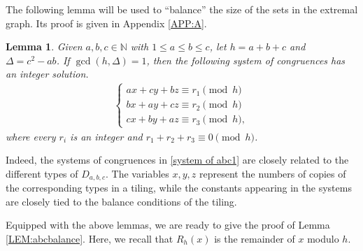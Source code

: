 \documentclass[11pt,a4paper,reqno]{amsart}
\newtheorem{lemma}[theorem]{Lemma}
\theoremstyle{definition} %
\begin{document}
The following lemma will be used to ``balance'' the size of the sets in the extremal graph. Its proof is given in Appendix \ref{APP:A}.


\begin{lemma}\label{LEM-abc system2}   Given $a,b,c\in \mathbb{N}$ with $1\leqslant a\leqslant b\leqslant c$, let $h=a+b+c$ and $\Delta=c^2-ab$. If $\gcd(h,\Delta)=1$, then the following system of congruences has an integer solution.
    \begin{align}\label{system of abc1}
\begin{cases}
ax + cy + bz \equiv r_1 \pmod h\\
bx + ay + cz \equiv r_2 \pmod h\\
cx + by + az \equiv r_3 \pmod h,
\end{cases}
\end{align} 
where every $r_i$ is an integer and $r_1+r_2+r_3 \equiv 0\pmod h$.
\end{lemma}

Indeed, the systems of congruences in \eqref{system of abc1} are closely related to the different types of $D_{a,b,c}$. The variables $x,y,z$ represent the numbers of copies of the corresponding types in a tiling, while the constants appearing in the systems are closely tied to the balance conditions of the tiling.

\smallskip

Equipped with the above lemmas, we are ready to give the proof of Lemma \ref{LEM:abcbalance}.
Here, we recall that $R_h(x)$ is the remainder of $x$ modulo $h$. 
\end{document}

